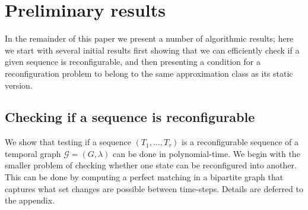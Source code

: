 \section{Preliminary results}
\label{sec:polynomial}
In the remainder of this paper we present a number of algorithmic results; here we start with several initial results first showing that we can efficiently check if a given sequence is reconfigurable, and then presenting a condition for a reconfiguration problem to belong to the same approximation class as its static version.

\subsection{Checking if a sequence is reconfigurable}

We show that testing if a sequence $(T_1,\dots,T_\tau)$ is a reconfigurable sequence of a temporal graph $\mathcal{G}=(G,\lambda)$ can be done in polynomial-time. We begin with the smaller problem of checking whether one state can be reconfigured into another. This can be done by computing a perfect matching in a bipartite graph that captures what set changes are possible between time-steps.  Details are deferred to the appendix. 

